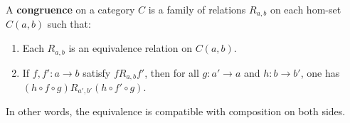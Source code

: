 A \textbf{congruence} on a category $C$ is a family of relations $R_{a,b}$ on each hom-set $C(a, b)$ such that:
\begin{enumerate}
\item[(i)] Each $R_{a,b}$ is an equivalence relation on $C(a, b)$.
\item[(ii)] If $f, f': a \to b$ satisfy $f R_{a,b} f'$, then for all $g: a' \to a$ and $h: b \to b'$, one has $(h \circ f \circ g) R_{a',b'} (h \circ f' \circ g)$.
\end{enumerate}
In other words, the equivalence is compatible with composition on both sides.
